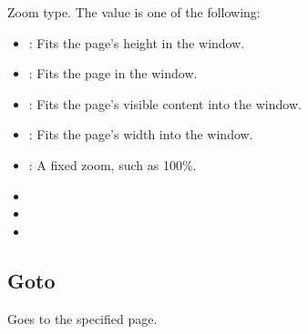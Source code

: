 \documentclass[letterpaper,12pt,english,openany,oneside]{sphinxmanual}
\begin{document}
Zoom type. The value is one of the following:
\begin{itemize}
\item {} 
: Fits the page’s height in the window.

\item {} 
: Fits the page in the window.

\item {} 
: Fits the page’s visible content into the window.

\item {} 
: Fits the page’s width into the window.

\item {} 
: A fixed zoom, such as 100\%.

\end{itemize}
\label{\detokenize{IAC_API_OLE_Objects:related-methods-58}}
\begin{itemize}
\item {} 
 

\item {} 
 

\item {} 
 

\end{itemize}




\subsection{Goto}
\label{\detokenize{IAC_API_OLE_Objects:goto}}
Goes to the specified page.


\begin{sphinxVerbatim}[commandchars=\\\{\}]
  
\end{sphinxVerbatim}
\label{\detokenize{IAC_API_OLE_Objects:parameters-34}}
\end{document}
